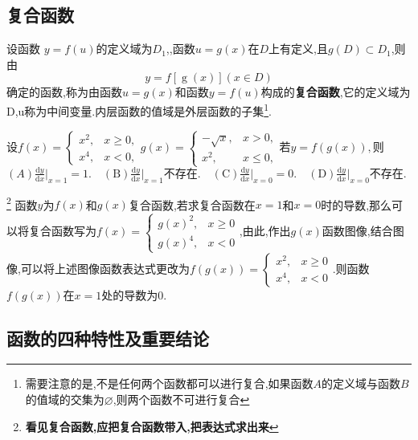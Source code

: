 \documentclass[8pt a4paper, oneside, UTF8]{ctexbook}  %
\begin{document}
\begin{sloppypar}
    \subsection{复合函数}
    设函数 $y=f(u)$的定义域为$D_1$,,函数$u=g(x)$在$D$上有定义,且$g(D) \subset D_1$,则由
    $$
        y=f[\operatorname{g}(x)](x{\in}D)
    $$
    确定的函数,称为由函数$u=g(x)$和函数$y=f(u)$构成的\textbf{复合函数},它的定义域为D,u称为中间变量.内层函数的值域是外层函数的子集\footnote{需要注意的是,不是任何两个函数都可以进行复合,如果函数$A$的定义域与函数$B$的值域的交集为$\varnothing$,则两个函数不可进行复合}.
    \begin{problem}
    $\text{设}f(x)=\begin{cases}x^2,&x\geqslant0,\\x^4,&x<0,\end{cases}g(x)=\begin{cases}-\sqrt{x},&x>0,\\x^2,&x\leqslant0,\end{cases}\text{若}y=f(g(x)),$则
    \newline
    $(A)\frac{\mathrm{d}y}{\mathrm{d}x}\bigg|_{x=1}=1.\quad(\mathrm{B})\frac{\mathrm{d}y}{\mathrm{d}x}\bigg|_{x=1}\text{不存在}.\quad(\mathrm{C})\frac{\mathrm{d}y}{\mathrm{d}x}\bigg|_{x=0}=0.\quad(\mathrm{D})\frac{\mathrm{d}y}{\mathrm{d}x}\bigg|_{x=0}\text{不存在}.$
    \end{problem}
    \begin{solution}\footnote{\textbf{看见复合函数,应把复合函数带入,把表达式求出来}}
        函数$y$为$f(x)$和$g(x)$复合函数,若求复合函数在$x=1$和$x=0$时的导数,那么可以将复合函数写为$f(x)=\begin{cases}g(x)^2,&x \geqslant 0\\g(x)^4,&x<0\end{cases}$,由此,作出$g(x)$函数图像,结合图像,可以将上述图像函数表达式更改为$f(g(x))=\begin{cases}x^2,&x\geqslant0\\x^4,&x<0\end{cases}$.则函数$f(g(x))$在$x=1$处的导数为0.
    \end{solution}
    \subsection{函数的四种特性及重要结论}

\end{sloppypar}
\end{document}
